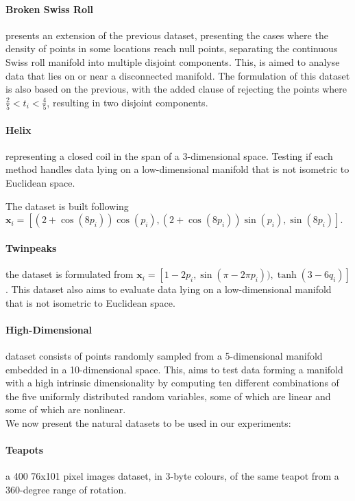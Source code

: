 \paragraph{Broken Swiss Roll} presents an extension of the previous dataset, presenting the cases where the density of points in some locations reach null points, separating the continuous Swiss roll manifold into multiple disjoint components. This, is aimed to analyse data that lies on or near a disconnected manifold. The formulation of this dataset is also based on the previous, with the added clause of rejecting the points where $\frac{2}{5} < t_i < \frac{4}{5}$, resulting in two disjoint components.

\paragraph{Helix} representing a closed coil in the span of a 3-dimensional space. Testing if each method handles data lying on a low-dimensional manifold that is not isometric to Euclidean space.

The dataset is built following $\bm{x}_i = [(2 + \cos(8p_i)) \cos(p_i),(2 + \cos(8p_i)) \sin(p_i), \sin(8p_i)]$.

\paragraph{Twinpeaks}
the dataset is formulated from $\bm{x}_i = [1 - 2p_i, \sin(\pi - 2\pi p_i)), \tanh(3 - 6q_i)]$.
This dataset also aims to evaluate data lying on a low-dimensional manifold that is
not isometric to Euclidean space.

\paragraph{High-Dimensional} dataset consists of points randomly sampled from a 5-dimensional manifold embedded in a 10-dimensional space.
This, aims to test data forming a manifold with a high intrinsic dimensionality by computing ten different combinations of the five uniformly distributed random variables, some of which are linear and some of which are nonlinear.\\

We now present the natural datasets to be used in our experiments:

\paragraph{Teapots} a 400 76x101 pixel images dataset, in 3-byte colours, of the same teapot from a 360-degree range of rotation.

